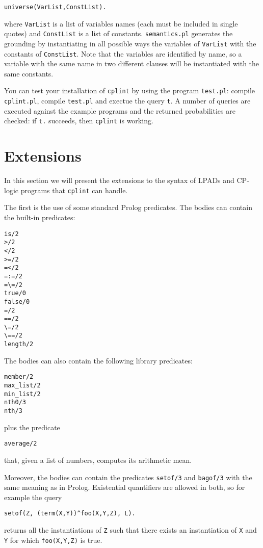 \documentclass[a4paper,12pt]{article}
\begin{document}
\begin{verbatim}
universe(VarList,ConstList).
\end{verbatim}
where \texttt{VarList} is a list of variables names (each must be included in single quotes) and \texttt{ConstList} is a list of constants. \texttt{semantics.pl} generates the grounding by instantiating in all possible ways the variables of \texttt{VarList} with the constants of \texttt{ConstList}. Note that the variables are identified by name, so a variable with the same name in two different clauses will be instantiated with the same constants.

You can test your installation of \texttt{cplint} by using the program \texttt{test.pl}:
compile \texttt{cplint.pl}, compile \texttt{test.pl} and exectue the query \texttt{t}. 
A number of queries are executed against the example programs and the returned probabilities are checked: if \texttt{t.} succeeds, then \texttt{cplint} is working.


\section{Extensions}
In this section we will present the extensions to the syntax of LPADs and CP-logic programs that \texttt{cplint} can handle.

The first is the use of some standard Prolog predicates.
The bodies can contain the built-in predicates:
\begin{verbatim}
is/2
>/2
</2
>=/2
=</2
=:=/2
=\=/2
true/0
false/0
=/2
==/2
\=/2
\==/2
length/2
\end{verbatim}
The bodies can also contain the following
 library predicates:
\begin{verbatim}
member/2
max_list/2
min_list/2
nth0/3
nth/3
\end{verbatim}
plus the predicate
\begin{verbatim}
average/2
\end{verbatim}
that, given a list of numbers, computes its arithmetic mean.

Moreover, the bodies can contain the predicates \texttt{setof/3} and \texttt{bagof/3} with the same meaning as in Prolog. Existential quantifiers are allowed in both, so for example the query
\begin{verbatim}
setof(Z, (term(X,Y))^foo(X,Y,Z), L).
\end{verbatim}
returns all the instantiations of \texttt{Z} such that there exists an instantiation of \texttt{X} and \texttt{Y} for which \texttt{foo(X,Y,Z)} is true.
\end{document}
